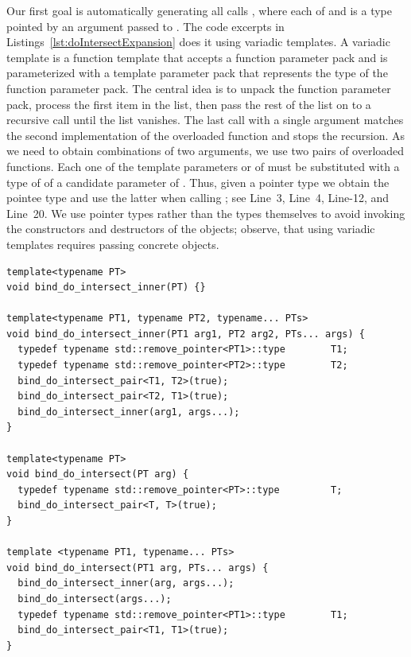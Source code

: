 Our first goal is automatically generating all calls 
, where
each of  and  is a type 
pointed by an argument passed to .
The code excerpts in Listings~\ref{lst:doIntersectExpansion} does it using 
variadic templates. A variadic template is a function template that accepts
a function parameter pack and is parameterized with a template parameter pack 
that represents the type of the function parameter pack. The central idea is 
to unpack the function parameter pack, process the first item in the list, then 
pass the rest of the list on to a recursive call until the list vanishes. The 
last call with a single argument matches the second implementation of the 
overloaded function and stops the recursion. As we need to obtain combinations 
of two arguments, we use two pairs of overloaded functions. Each one of the  
template parameters  or  of  must be substituted with a type of
of a candidate parameter of . Thus, given
a pointer type we obtain the pointee type and use the latter when calling
; see Line~3, 
Line~4, Line-12, and Line~20. We use pointer types rather than the types 
themselves to avoid invoking the constructors and destructors of the objects; 
observe, that using variadic templates requires passing concrete objects.

\begin{lstfloat}
  \begin{lstlisting}[style=cppFramedStyle,basicstyle=\normalsize,%
                     label={lst:doIntersectExpansion},%
                     caption={Automatic generation of calls
                     \cppLstinline{bind_do_intersect_pair<T1, T2>(true)}.}]
template<typename PT>
void bind_do_intersect_inner(PT) {}

template<typename PT1, typename PT2, typename... PTs>
void bind_do_intersect_inner(PT1 arg1, PT2 arg2, PTs... args) {
  typedef typename std::remove_pointer<PT1>::type        T1;
  typedef typename std::remove_pointer<PT2>::type        T2;
  bind_do_intersect_pair<T1, T2>(true);
  bind_do_intersect_pair<T2, T1>(true);
  bind_do_intersect_inner(arg1, args...);
}

template<typename PT>
void bind_do_intersect(PT arg) {
  typedef typename std::remove_pointer<PT>::type         T;
  bind_do_intersect_pair<T, T>(true);
}

template <typename PT1, typename... PTs>
void bind_do_intersect(PT1 arg, PTs... args) {
  bind_do_intersect_inner(arg, args...);
  bind_do_intersect(args...);
  typedef typename std::remove_pointer<PT1>::type        T1;
  bind_do_intersect_pair<T1, T1>(true);
}
  \end{lstlisting}
\end{lstfloat}

